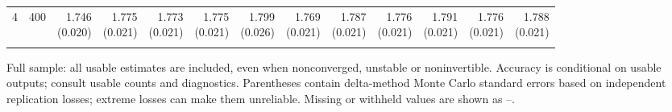 \begin{table}[p]
{\begin{tabular}{llrrrrrrrrrrr}
4 & 400 & \shortstack{1.746\\(0.020)} & \shortstack{1.775\\(0.021)} & \shortstack{1.773\\(0.021)} & \shortstack{1.775\\(0.021)} & \shortstack{1.799\\(0.026)} & \shortstack{1.769\\(0.021)} & \shortstack{1.787\\(0.021)} & \shortstack{1.776\\(0.021)} & \shortstack{1.791\\(0.021)} & \shortstack{1.776\\(0.021)} & \shortstack{1.788\\(0.021)} \\
\addlinespace
\bottomrule\end{tabular}}
\par\medskip
\begin{minipage}{\linewidth}\footnotesize Full sample: all usable estimates are included, even when nonconverged, unstable or noninvertible. Accuracy is conditional on usable outputs; consult usable counts and diagnostics. Parentheses contain delta-method Monte Carlo standard errors based on independent replication losses; extreme losses can make them unreliable.  Missing or withheld values are shown as --.\end{minipage}
\end{table}
